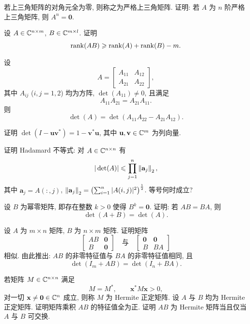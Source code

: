 \begin{exercises}

\item 若上三角矩阵的对角元全为零, 则称之为严格上三角矩阵. 证明: 若 $A$ 为 $n$ 阶严格上三角矩阵, 则 $A^{n}=\mathbf{0}$.

\item 设 $A\in\mathbb{C}^{n\times m}$, $B\in\mathbb{C}^{m\times l}$. 证明
  \[
    \operatorname{rank}(AB)\geqslant\operatorname{rank}(A)+\operatorname{rank}(B)-m.
  \]

\item 设
  \[
    A=\begin{bmatrix} A_{11} & A_{12}\\ A_{21} & A_{22}\end{bmatrix},
  \]
  其中 $A_{ij}$ ($i,j=1,2$) 均为方阵, $\det(A_{11})\neq 0$, 且满足
  \[
    A_{11}A_{21}=A_{21}A_{11}.
  \]
  则
  \[
    \det(A)=\det(A_{11}A_{22}-A_{21}A_{12}).
  \]

\item 证明 $\det(I-\mathbf{u}\mathbf{v}^{*})=1-\mathbf{v}^{*}\mathbf{u}$, 其中 $\mathbf{u},\mathbf{v}\in\mathbb{C}^{m}$ 为列向量.

\item 证明 Hadamard 不等式: 对 $A\in\mathbb{C}^{n\times n}$ 有
  \[
    |\det(A)|\leqslant\prod_{j=1}^{n}\left\|\mathbf{a}_j\right\|_2,
  \]
  其中 $\mathbf{a}_j=A(:,j)$, $\left\|\mathbf{a}_j\right\|_2=\left(\sum_{i=1}^{n}|A(i,j)|^{2}\right)^{\frac{1}{2}}$. 等号何时成立?

\item 设 $B$ 为幂零矩阵, 即存在整数 $k>0$ 使得 $B^{k}=\mathbf{0}$. 证明: 若 $AB=BA$, 则
  \[
    \det(A+B)=\det(A).
  \]

\item 设 $A$ 为 $m\times n$ 矩阵, $B$ 为 $n\times m$ 矩阵. 证明矩阵
  \[
    \begin{bmatrix} AB & \mathbf{0}\\ B & \mathbf{0}\end{bmatrix}
    \quad\text{与}\quad
    \begin{bmatrix} \mathbf{0} & \mathbf{0}\\ B & BA\end{bmatrix}
  \]
  相似. 由此推出: $AB$ 的非零特征值与 $BA$ 的非零特征值相同, 且
  \[
    \det(I_m+AB)=\det(I_n+BA).
  \]

\item 若矩阵 $M\in\mathbb{C}^{n\times n}$ 满足
  \[
    M=M^{*},\qquad \mathbf{x}^{*}M\mathbf{x}>0,
  \]
  对一切 $\mathbf{x}\neq\mathbf{0}\in\mathbb{C}^{n}$ 成立, 则称 $M$ 为 Hermite 正定矩阵. 设 $A$ 与 $B$ 均为 Hermite 正定矩阵.
  \subquest 证明矩阵乘积 $AB$ 的特征值全为正.
  \subquest 证明 $AB$ 为 Hermite 矩阵当且仅当 $A$ 与 $B$ 可交换.


\end{exercises}
